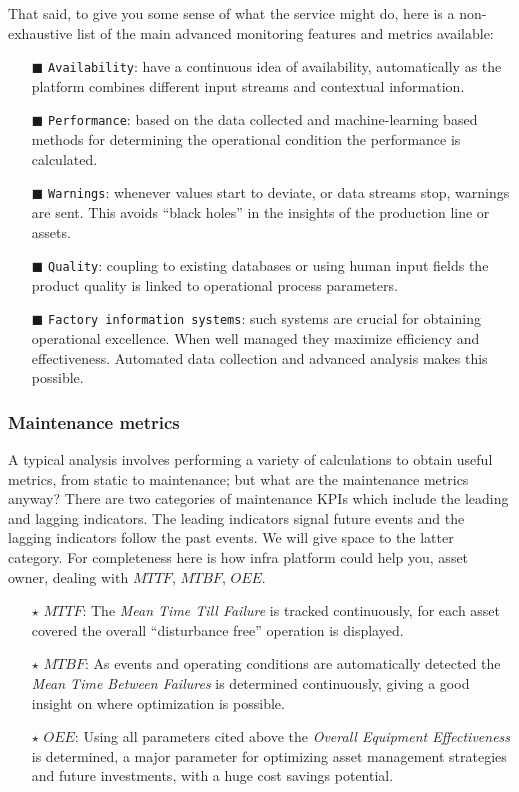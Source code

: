 That said, to give you some sense of what the service might do, here is a non-exhaustive list of the main advanced monitoring features and metrics available:
\begin{enumerate}
	\item[$\blacksquare$]\texttt{Availability}: have a continuous idea of availability, automatically as the platform combines different input streams and contextual information.
	\item[$\blacksquare$]\texttt{Performance}: based on the data collected and machine-learning based methods for determining the operational condition the performance is calculated.
	\item[$\blacksquare$]\texttt{Warnings}: whenever values start to deviate, or data streams stop, warnings are sent. This avoids ``black holes'' in the insights of the production line or assets.
	\item[$\blacksquare$]\texttt{Quality}: coupling to existing databases or using human input fields the product quality is linked to operational process parameters.
	\item[$\blacksquare$]\texttt{Factory information systems}: such systems are crucial for obtaining operational excellence. When well managed they maximize efficiency and effectiveness. Automated data collection and advanced analysis makes this possible.
\end{enumerate}

\subsubsection[short]{Maintenance metrics}
A typical analysis involves performing a variety of calculations to obtain useful metrics, from static to maintenance; but what are the maintenance metrics anyway? 
There are two categories of maintenance \ac{KPIs} which include the leading and lagging indicators. The leading indicators signal future events and the lagging indicators follow the past events.
We will give space to the latter category. For completeness here is how \acl{infra} platform could help you, asset owner, dealing with $MTTF$, $MTBF$, $OEE$.  
\begin{itemize}
	\item[$\star$] $MTTF$: The \textit{Mean Time Till Failure} is tracked continuously, for each asset covered the overall ``disturbance free'' operation is displayed.
	\item[$\star$] $MTBF$: As events and operating conditions are automatically detected the \textit{Mean Time Between Failures} is determined continuously, giving a good insight on where optimization is possible.
	\item[$\star$] $OEE$: Using all parameters cited above the \textit{Overall Equipment Effectiveness} is determined, a major parameter for optimizing asset management strategies and future investments, with a huge cost savings potential.
\end{itemize}